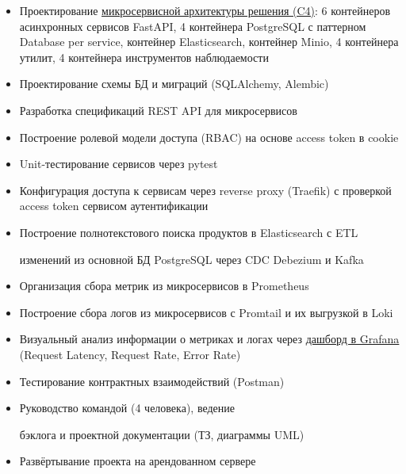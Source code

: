 \documentclass[14pt, a4paper, oneside]{extarticle}
\begin{document}
\begin{itemize}
	\vspace{-2\intextsep}
	\item Проектирование \href{https://github.com/Crazy5202/job_application_form/tree/main/portfolio/eComm_C4.pdf}{микросервисной архитектуры решения (C4)}: 6 контейнеров асинхронных сервисов FastAPI, 4 контейнера PostgreSQL с паттерном Database per service, контейнер Elasticsearch, контейнер Minio, 4 контейнера утилит, 4 контейнера инструментов наблюдаемости 
	\vspace{-0.8\intextsep}
	\item Проектирование схемы БД и миграций (SQLAlchemy, Alembic)
	\vspace{-0.8\intextsep}
	\item Разработка спецификаций REST API для микросервисов
	\vspace{-0.8\intextsep}
	\item Построение ролевой модели доступа (RBAC) на основе access token в cookie
	\vspace{-0.8\intextsep}
	\item Unit-тестирование сервисов через pytest
	\vspace{-0.8\intextsep}
	\item Конфигурация доступа к сервисам через reverse proxy (Traefik) с проверкой access token сервисом аутентификации
	\vspace{-0.8\intextsep}
	\item Построение полнотекстового поиска продуктов в Elasticsearch с ETL
	
	\vspace{-0.5\intextsep} 
	изменений из основной БД PostgreSQL через CDC Debezium и Kafka
	\vspace{-0.8\intextsep}
	\item Организация сбора метрик из микросервисов в Prometheus
	\vspace{-0.8\intextsep}
	\item Построение сбора логов из микросервисов с Promtail и их выгрузкой в Loki
	\vspace{-0.8\intextsep}
	\item Визуальный анализ информации о метриках и логах через \href{https://github.com/Crazy5202/job_application_form/tree/main/portfolio/eComm_Grafana.pdf}{дашборд в Grafana} (Request Latency, Request Rate, Error Rate)
	\vspace{-0.8\intextsep}
	\item Тестирование контрактных взаимодействий (Postman)
	\vspace{-0.8\intextsep}
    \item Руководство командой (4 человека), ведение 

    \vspace{-0.5\intextsep}
    бэклога и проектной документации (ТЗ, диаграммы UML)
    \vspace{-0.8\intextsep}
    \item Развёртывание проекта на арендованном сервере
\end{itemize}
\end{document}
